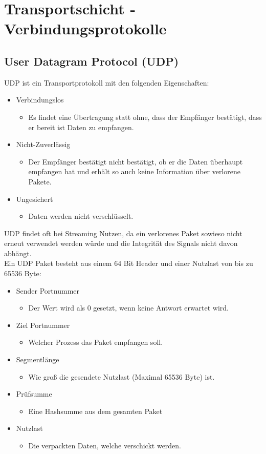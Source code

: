 \documentclass{article}
\begin{document}
	 \section{Transportschicht - Verbindungsprotokolle}
	 \subsection{User Datagram Protocol (UDP)}
	 UDP ist ein Transportprotokoll mit den folgenden Eigenschaften:
	 \begin{itemize}
	 	\item{Verbindungslos}
	 	\begin{itemize}
	 		\item{Es findet eine Übertragung statt ohne, dass der Empfänger bestätigt, dass er bereit ist Daten zu empfangen.}
	 	\end{itemize}
	 	\item{Nicht-Zuverlässig}
	 	\begin{itemize}
	 		\item{Der Empfänger bestätigt nicht bestätigt, ob er die Daten überhaupt empfangen hat und erhält so auch keine Information über verlorene Pakete.}
	 	\end{itemize}
	 	\item{Ungesichert}
	 	\begin{itemize}
	 		\item{Daten werden nicht verschlüsselt.}
	 	\end{itemize}
	 \end{itemize}
	 UDP findet oft bei Streaming Nutzen, da ein verlorenes Paket sowieso nicht erneut verwendet werden würde und die Integrität des Signals nicht davon abhängt. \\
	 Ein UDP Paket besteht aus einem 64 Bit Header und einer Nutzlast von bis zu 65536 Byte:
	 \begin{itemize}
	 	\item{Sender Portnummer}
	 	\begin{itemize}
	 		\item{Der Wert wird als 0 gesetzt, wenn keine Antwort erwartet wird.}
	 	\end{itemize}
	 	\item{Ziel Portnummer}
	 	\begin{itemize}
	 		\item{Welcher Prozess das Paket empfangen soll.}
	 	\end{itemize}
	 	\item{Segmentlänge}
	 	\begin{itemize}
	 		\item{Wie groß die gesendete Nutzlast (Maximal 65536 Byte) ist.}
	 	\end{itemize}
	 	\item{Prüfsumme}
	 	\begin{itemize}
	 		\item{Eine Hashsumme aus dem gesamten Paket}
	 	\end{itemize}
	 	\item{Nutzlast}
	 	\begin{itemize}
	 		\item{Die verpackten Daten, welche verschickt werden.}
	 	\end{itemize}
	 \end{itemize}
\end{document}
